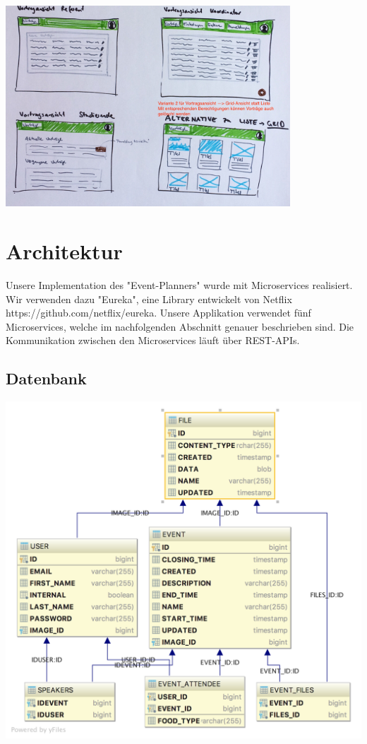 \documentclass[11pt]{article} %
\begin{document}
\includegraphics[width=0.8\textwidth]{prototyp/Vortragansicht}

\section{Architektur}
Unsere Implementation des "Event-Planners" wurde mit Microservices realisiert. Wir verwenden dazu "Eureka", eine Library entwickelt von Netflix https://github.com/netflix/eureka.  Unsere Applikation verwendet fünf Microservices, welche im nachfolgenden Abschnitt genauer beschrieben sind. Die Kommunikation zwischen den Microservices läuft über REST-APIs.

\subsection{Datenbank}
\includegraphics[width=1\textwidth]{dbSchema}
\end{document}
